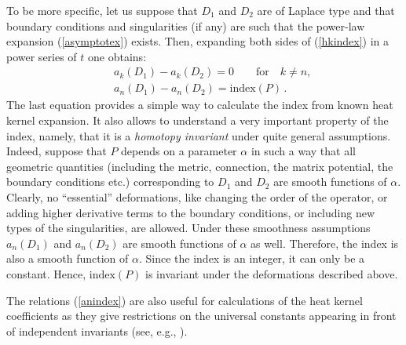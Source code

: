 To be more specific, let us suppose that $D_1$ and $D_2$ are of
Laplace type and that boundary conditions and singularities (if any)
are such that the power-law expansion (\ref{asymptotex}) exists.
Then, expanding both sides of (\ref{hkindex}) in a power series
of $t$ one obtains:
\begin{eqnarray}
&&a_k(D_1)-a_k(D_2)=0 \qquad \mbox{for}\quad k\ne n,\nonumber\\
&&a_n(D_1)-a_n(D_2)=\mbox{index}(P) \,.\label{anindex}
\end{eqnarray}
The last equation provides a simple way to calculate the
index from known heat kernel expansion. It also allows to understand
a very important property of the index, namely, that it is a
{\it homotopy invariant} under quite general assumptions.
Indeed, suppose that $P$ depends on a parameter $\alpha$ in 
such a way that all geometric quantities (including
the metric, connection, the matrix potential, the boundary
conditions etc.)
corresponding to $D_1$ and $D_2$ are smooth functions of $\alpha$.
Clearly, no ``essential'' deformations, like changing the order
of the operator, or adding higher derivative terms to the boundary conditions, 
or including
new types of the singularities, are allowed. Under these smoothness
assumptions $a_n(D_1)$ and $a_n(D_2)$ are smooth functions of
$\alpha$ as well. Therefore, the index is also a smooth function
of $\alpha$. Since the index is an integer, it can only be a constant.
Hence, ${\mbox{index}}(P)$ is invariant under the deformations
described above.

The relations (\ref{anindex}) are also useful for calculations
of the heat kernel coefficients as they give restrictions on the
universal constants appearing in front of independent invariants
(see, e.g., \cite{Gilkey:1995}).

